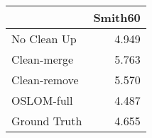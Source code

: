 \begin{tabular}{lr}
\toprule
{} & Smith60 \\
\midrule
No Clean Up  &   4.949 \\
Clean-merge  &   5.763 \\
Clean-remove &   5.570 \\
OSLOM-full   &   4.487 \\
Ground Truth &   4.655 \\
\bottomrule
\end{tabular}

